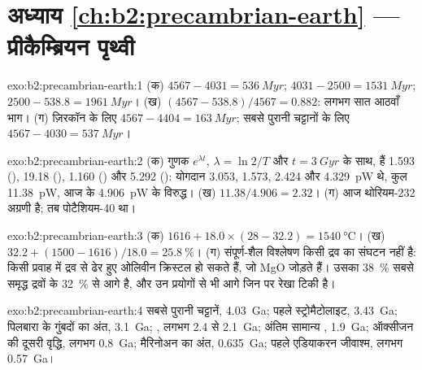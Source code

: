 \section*{अध्याय \ref{ch:b2:precambrian-earth} --- प्रीकैम्ब्रियन पृथ्वी}

\begin{solution}{exo:b2:precambrian-earth:1}
(क)  $4567 - 4031 = \qty{536}{Myr}$;  $4031 - 2500 = \qty{1531}{Myr}$;
 $2500 - 538.8 = \qty{1961}{Myr}$। (ख) $(4567 - 538.8)/4567 = 0.882$: लगभग सात
आठवाँ भाग। (ग) ज़िरकॉन के लिए $4567 - 4404 = \qty{163}{Myr}$; सबसे पुरानी चट्टानों के लिए
$4567 - 4030 = \qty{537}{Myr}$।
\end{solution}

\begin{solution}{exo:b2:precambrian-earth:2}
(क) गुणक $e^{\lambda t}$, $\lambda = \ln2/T$ और $t = \qty{3}{Gyr}$ के साथ, हैं 1.593
(), 19.18 (), 1.160 () और 5.292 (): योगदान
3.053, 1.573, 2.424 और \qty{4.329}{pW} थे, कुल \qty{11.38}{pW}, आज के
\qty{4.906}{pW} के विरुद्ध। (ख) $11.38/4.906 = 2.32$। (ग) आज थोरियम-232 अग्रणी है; तब
पोटैशियम-40 था।
\end{solution}

\begin{solution}{exo:b2:precambrian-earth:3}
(क) $1616 + 18.0\times(28 - 32.2) = \qty{1540}{\celsius}$। (ख) $32.2 + (1500 - 1616)/18.0 =
\qty{25.8}{\percent}$। (ग) संपूर्ण-शैल विश्लेषण किसी द्रव का संघटन नहीं है: किसी
 प्रवाह में द्रव से ढेर हुए ओलिवीन क्रिस्टल हो सकते हैं, जो MgO जोड़ते हैं। उसका
\qty{38}{\percent} सबसे समृद्ध  द्रवों के \qty{32}{\percent} से आगे है, और
उन प्रयोगों से भी आगे जिन पर रेखा टिकी है।
\end{solution}

\begin{solution}{exo:b2:precambrian-earth:4}
सबसे पुरानी चट्टानें, \qty{4.03}{Ga}; पहले स्ट्रोमैटोलाइट, \qty{3.43}{Ga}; पिलबारा के गुंबदों का अंत,
\qty{3.1}{Ga}; , लगभग 2.4 से \qty{2.1}{Ga}; अंतिम सामान्य ,
\qty{1.9}{Ga}; ऑक्सीजन की दूसरी वृद्धि, लगभग \qty{0.8}{Ga}; मैरिनोअन का अंत,
\qty{0.635}{Ga}; पहले एडियाकरन जीवाश्म, लगभग \qty{0.57}{Ga}।
\end{solution}

